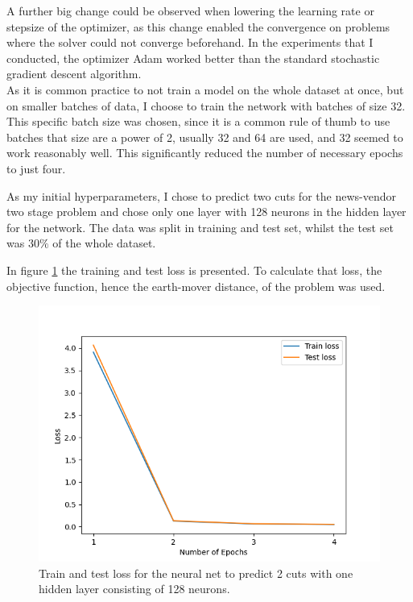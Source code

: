 A further big change could be observed when lowering the learning rate or stepsize of the optimizer, as this change enabled the convergence on problems where the solver could not converge beforehand.
In the experiments that I conducted, the optimizer Adam \cite{adam_optimizer} worked better than the standard stochastic gradient descent algorithm. \\
As it is common practice to not train a model on the whole dataset at once, but on smaller batches of data, I choose to train the network with batches of size 32. \\
This specific batch size was chosen, since it is a common rule of thumb to use batches that size are a power of 2, usually 32 and 64 are used, and 32 seemed to work reasonably well.
This significantly reduced the number of necessary epochs to just four.

As my initial hyperparameters, I chose to predict two cuts for the news-vendor two stage problem and chose only one layer with 128 neurons in the hidden layer for the network.
The data was split in training and test set, whilst the test set was $30\%$ of the whole dataset. 

In figure \ref{fig:train_test_2pieces} the training and test loss is presented.
To calculate that loss, the objective function, hence the earth-mover distance, of the problem was used.

\begin{figure}[H]
    \centering
    \includegraphics[width=0.85\linewidth]{correct_train_test_loss2piece.png}
    \caption{Train and test loss for the neural net to predict 2 cuts with one hidden layer consisting of 128 neurons.}
    \label{fig:train_test_2pieces}
\end{figure}

